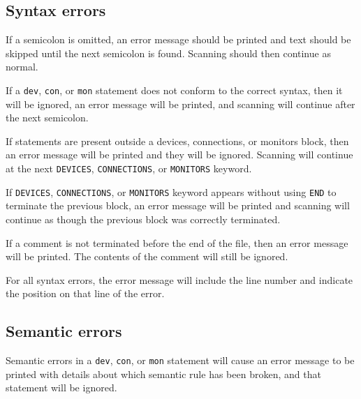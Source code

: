 \documentclass[a4paper,10pt]{article}
\begin{document}
\subsection{Syntax errors}

If a semicolon is omitted, an error message should be printed and text should be skipped until the next semicolon is found. Scanning should then continue as normal.

If a \texttt{dev}, \texttt{con}, or \texttt{mon} statement does not conform to the correct syntax, then it will be ignored, an error message will be printed, and scanning will continue after the next semicolon. 

If statements are present outside a devices, connections, or monitors block, then an error message will be printed and they will be ignored. Scanning will continue at the next \texttt{DEVICES}, \texttt{CONNECTIONS}, or \texttt{MONITORS} keyword. 

If \texttt{DEVICES}, \texttt{CONNECTIONS}, or \texttt{MONITORS} keyword appears without using \texttt{END} to terminate the previous block, an error message will be printed and scanning will continue as though the previous block was correctly terminated. 

If a comment is not terminated before the end of the file, then an error message will be printed. The contents of the comment will still be ignored. 

For all syntax errors, the error message will include the line number and indicate the position on that line of the error.


\subsection{Semantic errors}

Semantic errors in a \texttt{dev}, \texttt{con}, or \texttt{mon} statement will cause an error message to be printed with details about which semantic rule has been broken, and that statement will be ignored. 

\clearpage
\appendix
\end{document}
